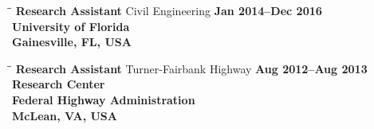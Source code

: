 \documentclass[margin,line]{resume}
\begin{document}
\begin{resume}
    \begin{tabbing}
   \hspace{2.0in}\= \hspace{2.6in}\= \kill %
    {\bf Research Assistant} \> Civil Engineering \> \bf Jan 2014--Dec 2016\\
                          \> {\bf University of Florida} \\ \> Gainesville, FL, USA
   \end{tabbing}\vspace{-20pt}


     \begin{tabbing}
     \hspace{2.0in}\= \hspace{2.6in}\=\kill
     {\bf Research Assistant}\> Turner-Fairbank Highway \> \bf Aug 2012--Aug 2013\\
     \>Research Center\\
     \> \bf Federal Highway Administration \>  \\
\> McLean, VA, USA
    \end{tabbing}\vspace{-20pt}



\end{resume}
\end{document}
